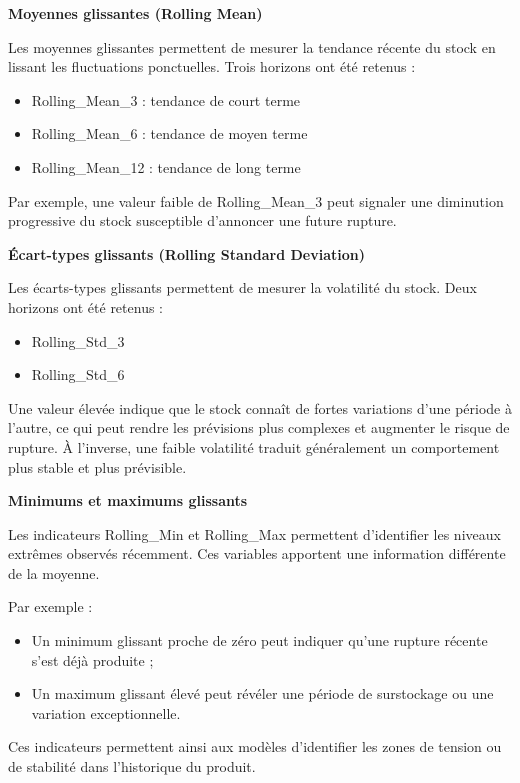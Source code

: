 \textbf{Moyennes glissantes (Rolling Mean)} 
 
Les moyennes glissantes permettent de mesurer la tendance récente du stock en lissant les fluctuations ponctuelles. Trois horizons ont été retenus :
 
\begin{itemize}
    \item Rolling\_Mean\_3 : tendance de court terme 
    \item Rolling\_Mean\_6 : tendance de moyen terme 
    \item Rolling\_Mean\_12 : tendance de long terme
\end{itemize}
 
Par exemple, une valeur faible de Rolling\_Mean\_3 peut signaler une diminution progressive du stock susceptible d'annoncer une future rupture.
 
\textbf{Écart-types glissants (Rolling Standard Deviation)} 
 
Les écarts-types glissants permettent de mesurer la volatilité du stock. Deux horizons ont été retenus :
 
\begin{itemize}
    \item Rolling\_Std\_3
    \item Rolling\_Std\_6
\end{itemize}
 
Une valeur élevée indique que le stock connaît de fortes variations d'une période à l'autre, ce qui peut rendre les prévisions plus complexes et augmenter le risque de rupture. À l'inverse, une faible volatilité traduit généralement un comportement plus stable et plus prévisible.
 
\textbf{Minimums et maximums glissants} 
 
Les indicateurs Rolling\_Min et Rolling\_Max permettent d'identifier les niveaux extrêmes observés récemment. Ces variables apportent une information différente de la moyenne.
 
Par exemple :
 
\begin{itemize}
    \item Un minimum glissant proche de zéro peut indiquer qu'une rupture récente s'est déjà produite ;
    \item Un maximum glissant élevé peut révéler une période de surstockage ou une variation exceptionnelle.
\end{itemize}
 
Ces indicateurs permettent ainsi aux modèles d'identifier les zones de tension ou de stabilité dans l'historique du produit.
 
